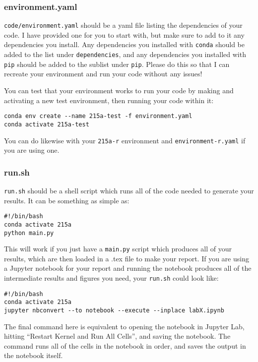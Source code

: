 \documentclass[letterpaper,12pt]{article}
\begin{document}
\subsubsection{environment.yaml}
\texttt{code/environment.yaml} should be a yaml file listing the dependencies of your code. I have provided one for you to start with, but make sure to add to it any dependencies you install. Any dependencies you installed with \texttt{conda} should be added to the list under \texttt{dependencies}, and any dependencies you installed with \texttt{pip} should be added to the sublist under \texttt{pip}. Please do this so that I can recreate your environment and run your code without any issues!

You can test that your environment works to run your code by making and activating a new test environment, then running your code within it:
\begin{verbatim}
conda env create --name 215a-test -f environment.yaml
conda activate 215a-test
\end{verbatim}
You can do likewise with your \texttt{215a-r} environment and \texttt{environment-r.yaml} if you are using one.

\subsubsection{run.sh}
\texttt{run.sh} should be a shell script which runs all of the code needed to generate your results. It can be something as simple as:
\begin{verbatim}
#!/bin/bash
conda activate 215a
python main.py
\end{verbatim}
This will work if you just have a \texttt{main.py} script which produces all of your results, which are then loaded in a .tex file to make your report. If you are using a Jupyter notebook for your report and running the notebook produces all of the intermediate results and figures you need, your \texttt{run.sh} could look like:
\begin{verbatim}
#!/bin/bash
conda activate 215a
jupyter nbconvert --to notebook --execute --inplace labX.ipynb
\end{verbatim}
The final command here is equivalent to opening the notebook in Jupyter Lab, hitting ``Restart Kernel and Run All Cells'', and saving the notebook. The command runs all of the cells in the notebook in order, and saves the output in the notebook itself.
\end{document}
